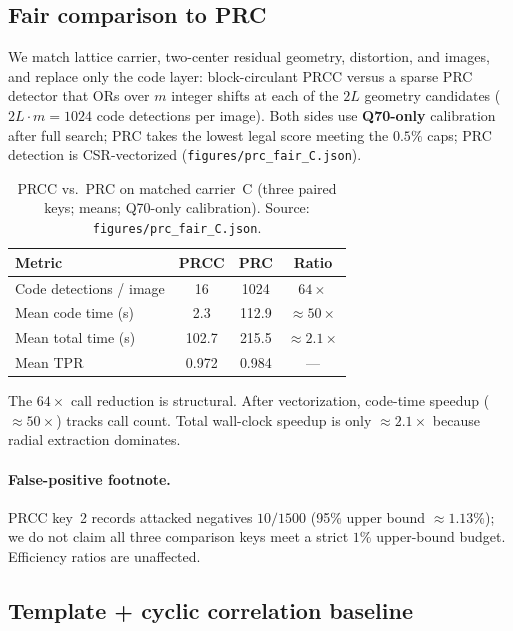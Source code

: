 \documentclass[11pt,a4paper]{article}
\begin{document}
\subsection{Fair comparison to PRC}
\label{sec:prc}

We match lattice carrier, two-center residual geometry, distortion, and images, and
replace only the code layer: block-circulant PRCC versus a sparse PRC detector that
ORs over \(m\) integer shifts at each of the \(2L\) geometry candidates
(\(2L\cdot m=1024\) code detections per image).
Both sides use \textbf{Q70-only} calibration after full search; PRC takes the lowest
legal score meeting the \(0.5\%\) caps; PRC detection is CSR-vectorized
(\texttt{figures/prc\_fair\_C.json}).

\begin{table}[t]
\centering
\caption{PRCC vs.\ PRC on matched carrier~C (three paired keys; means; Q70-only
calibration).
Source: \texttt{figures/prc\_fair\_C.json}.}
\label{tab:prc}
\begin{tabular}{@{}lccc@{}}
\toprule
Metric & PRCC & PRC & Ratio \\
\midrule
Code detections / image & 16 & 1024 & \(64\times\) \\
Mean code time (s) & 2.3 & 112.9 & \(\approx 50\times\) \\
Mean total time (s) & 102.7 & 215.5 & \(\approx 2.1\times\) \\
Mean TPR & 0.972 & 0.984 & --- \\
\bottomrule
\end{tabular}
\end{table}

The \(64\times\) call reduction is structural.
After vectorization, code-time speedup (\(\approx 50\times\)) tracks call count.
Total wall-clock speedup is only \(\approx 2.1\times\) because radial extraction
dominates.

\paragraph{False-positive footnote.}
PRCC key~2 records attacked negatives \(10/1500\) (95\% upper bound
\(\approx 1.13\%\)); we do not claim all three comparison keys meet a strict
\(1\%\) upper-bound budget.
Efficiency ratios are unaffected.

\subsection{Template + cyclic correlation baseline}
\label{sec:corr}
\end{document}
